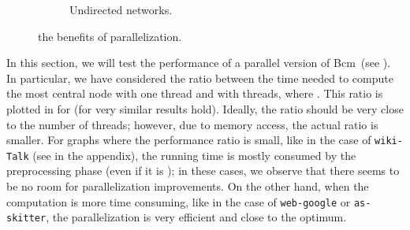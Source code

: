 \documentclass{acm_proc_article-sp}
\newcommand{\newalg}{{\sc Bcm}}
\begin{document}
\begin{figure}[t]
\begin{subfigure}[t]{0.49\textwidth}
\caption{Undirected networks.}
\end{subfigure}
\caption{the benefits of parallelization.}
\label{fig:parallel}
\end{figure}

In this section, we will test the performance of a parallel version of \newalg\ (see ). In particular, we have considered the ratio between the time needed to compute the most central node with one thread and with  threads, where . This ratio is plotted in  for  (for  very similar results hold). Ideally, the ratio should be very close to the number of threads; however, due to memory access, the actual ratio is smaller. For graphs where the performance ratio is small, like in the case of \texttt{wiki-Talk} (see  in the appendix), the running time is mostly consumed by the preprocessing phase (even if it is ); in these cases, we observe that there seems to be no room for parallelization improvements. On the other hand, when the computation is more time consuming, like in the case of \texttt{web-google} or \texttt{as-skitter}, the parallelization is very efficient and close to the optimum.
\end{document}
